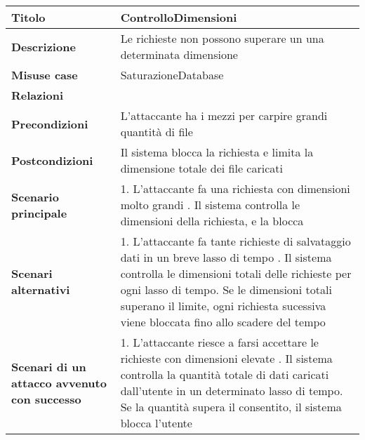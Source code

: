 \begin{tabular} {|P{4cm}|P{11.5cm}|}
  \hline
  \textbf{Titolo}                                      & ControlloDimensioni                                                                          \\
  \hline
  \textbf{Descrizione}                                 & Le richieste non possono superare un una determinata dimensione                              \\
  \hline
  \textbf{Misuse case}                                 & SaturazioneDatabase                                                                          \\
  \hline
  \textbf{Relazioni}                                   &                                                                                              \\
  \hline
  \textbf{Precondizioni}                               & L'attaccante ha i mezzi per carpire grandi quantità di file                                  \\
  \hline
  \textbf{Postcondizioni}                              & Il sistema blocca la richiesta e limita la dimensione totale dei file caricati               \\
  \hline
  \textbf{Scenario principale}                         & 1. L'attaccante fa una richiesta con dimensioni molto grandi . Il sistema controlla le dimensioni della richiesta, e la blocca                                                                                  \\
  \hline
  \textbf{Scenari alternativi}                         & 1. L'attaccante fa tante richieste di salvataggio dati in un breve lasso di tempo . Il sistema controlla le dimensioni totali delle richieste per ogni lasso di tempo. Se le dimensioni totali superano il limite, ogni richiesta sucessiva viene bloccata fino allo scadere del tempo                                  \\
  \hline
  \textbf{Scenari di un attacco avvenuto con successo} & 1. L'attaccante riesce a farsi accettare le richieste con dimensioni elevate . Il sistema controlla la quantità totale di dati caricati dall'utente in un determinato lasso di tempo. Se la quantità supera il consentito, il sistema blocca l'utente                                                                                  \\
  \hline
\end{tabular}
\hfill
\break

